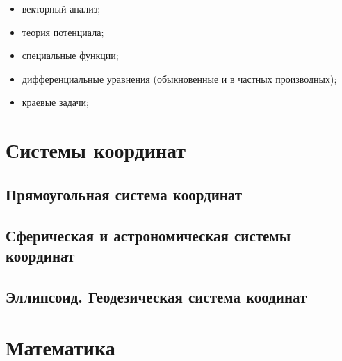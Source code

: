 \documentclass[11pt, a4paper]{article}
\theoremstyle{plain}
\theoremstyle{definition}
\theoremstyle{remark}
\begin{document}
\begin{itemize}
    \item векторный анализ;
    \item теория потенциала;
    \item специальные функции;
    \item дифференциальные уравнения (обыкновенные и в частных производных);
    \item краевые задачи;
\end{itemize}

\section{Системы координат}
\subsection{Прямоугольная система координат}

\subsection{Сферическая и астрономическая системы координат}

\subsection{Эллипсоид. Геодезическая система коодинат}

\section{Математика}

\printbibliography
\end{document}
